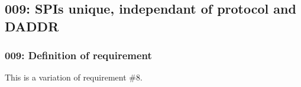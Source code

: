 \subsection{009: SPIs unique, independant of protocol and DADDR}

\subsubsection{009: Definition of requirement }

This is a variation of requirement \#8. 
